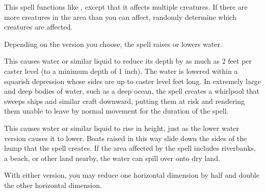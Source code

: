 \begin{spelleffect}
  This spell functions like , except that it affects multiple creatures. If there are more creatures in the area than you can affect, randomly determine which creatures are affected.
\end{spelleffect}

\spellrng{\rngfar}
\begin{spelleffect}
  Depending on the version you choose, the  spell raises or lowers water.
  \par {} This causes water or similar liquid to reduce its depth by as much as 2 feet per caster level (to a minimum depth of 1 inch). The water is lowered within a squarish depression whose sides are up to caster level  feet long. In extremely large and deep bodies of water, such as a deep ocean, the spell creates a whirlpool that sweeps ships and similar craft downward, putting them at risk and rendering them unable to leave by normal movement for the duration of the spell.
  \par {} This causes water or similar liquid to rise in height, just as the lower water version causes it to lower. Boats raised in this way slide down the sides of the hump that the spell creates. If the area affected by the spell includes riverbanks, a beach, or other land nearby, the water can spill over onto dry land.
\end{spelleffect}
\begin{spellnotes}
  With either version, you may reduce one horizontal dimension by half and double the other horizontal dimension.
\end{spellnotes}

